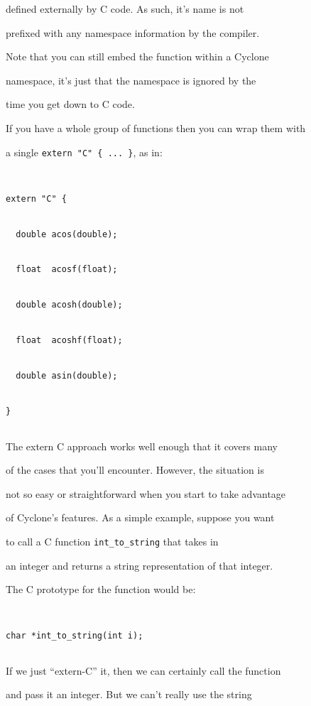 defined externally by C code.  As such, it's name is not


prefixed with any namespace information by the compiler.


Note that you can still embed the function within a Cyclone


namespace, it's just that the namespace is ignored by the


time you get down to C code.  





If you have a whole group of functions then you can wrap them with


a single \texttt{extern "C" \{ ... \}}, as in:


\begin{verbatim}


extern "C" {


  double acos(double);


  float  acosf(float);


  double acosh(double);


  float  acoshf(float);


  double asin(double);


}


\end{verbatim}





The extern C approach works well enough that it covers many


of the cases that you'll encounter.  However, the situation is


not so easy or straightforward when you start to take advantage


of Cyclone's features.  As a simple example, suppose you want


to call a C function \texttt{int\_to\_string} that takes in


an integer and returns a string representation of that integer.


The C prototype for the function would be:


\begin{verbatim}


char *int_to_string(int i);


\end{verbatim}


If we just ``extern-C'' it, then we can certainly call the function


and pass it an integer.  But we can't really use the string


